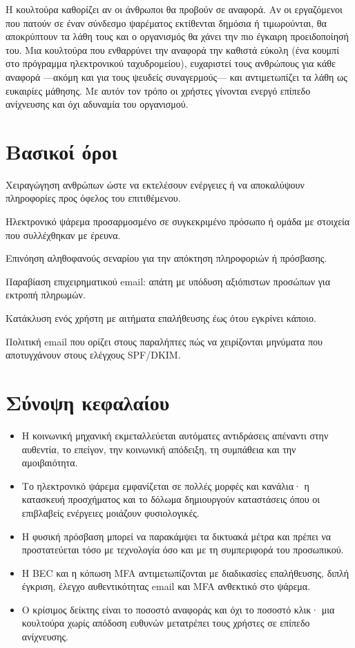 Η κουλτούρα καθορίζει αν οι άνθρωποι θα προβούν σε αναφορά. Αν οι εργαζόμενοι που πατούν σε έναν σύνδεσμο ψαρέματος εκτίθενται δημόσια ή τιμωρούνται, θα αποκρύπτουν τα λάθη τους και ο οργανισμός θα χάνει την πιο έγκαιρη προειδοποίησή του. Μια κουλτούρα που ενθαρρύνει την αναφορά την καθιστά εύκολη (ένα κουμπί στο πρόγραμμα ηλεκτρονικού ταχυδρομείου), ευχαριστεί τους ανθρώπους για κάθε αναφορά —ακόμη και για τους ψευδείς συναγερμούς— και αντιμετωπίζει τα λάθη ως ευκαιρίες μάθησης. Με αυτόν τον τρόπο οι χρήστες γίνονται ενεργό επίπεδο ανίχνευσης και όχι αδυναμία του οργανισμού.

\section*{Βασικοί όροι}
\begin{description}[style=nextline,leftmargin=1.2em]
  \item[Κοινωνική μηχανική] Χειραγώγηση ανθρώπων ώστε να εκτελέσουν ενέργειες ή να αποκαλύψουν πληροφορίες προς όφελος του επιτιθέμενου.
  \item[Στοχευμένο ψάρεμα] Ηλεκτρονικό ψάρεμα προσαρμοσμένο σε συγκεκριμένο πρόσωπο ή ομάδα με στοιχεία που συλλέχθηκαν με έρευνα.
  \item[Κατασκευή προσχήματος] Επινόηση αληθοφανούς σεναρίου για την απόκτηση πληροφοριών ή πρόσβασης.
  \item[BEC] Παραβίαση επιχειρηματικού email: απάτη με υπόδυση αξιόπιστων προσώπων για εκτροπή πληρωμών.
  \item[Κόπωση MFA] Κατάκλυση ενός χρήστη με αιτήματα επαλήθευσης έως ότου εγκρίνει κάποιο.
  \item[DMARC] Πολιτική email που ορίζει στους παραλήπτες πώς να χειρίζονται μηνύματα που αποτυγχάνουν στους ελέγχους SPF/DKIM.
\end{description}

\section*{Σύνοψη κεφαλαίου}
\begin{itemize}
  \item Η κοινωνική μηχανική εκμεταλλεύεται αυτόματες αντιδράσεις απέναντι στην αυθεντία, το επείγον, την κοινωνική απόδειξη, τη συμπάθεια και την αμοιβαιότητα.
  \item Το ηλεκτρονικό ψάρεμα εμφανίζεται σε πολλές μορφές και κανάλια· η κατασκευή προσχήματος και το δόλωμα δημιουργούν καταστάσεις όπου οι επιβλαβείς ενέργειες μοιάζουν φυσιολογικές.
  \item Η φυσική πρόσβαση μπορεί να παρακάμψει τα δικτυακά μέτρα και πρέπει να προστατεύεται τόσο με τεχνολογία όσο και με τη συμπεριφορά του προσωπικού.
  \item Η BEC και η κόπωση MFA αντιμετωπίζονται με διαδικασίες επαλήθευσης, διπλή έγκριση, έλεγχο αυθεντικότητας email και MFA ανθεκτικό στο ψάρεμα.
  \item Ο κρίσιμος δείκτης είναι το ποσοστό αναφοράς και όχι το ποσοστό κλικ· μια κουλτούρα χωρίς απόδοση ευθυνών μετατρέπει τους χρήστες σε επίπεδο ανίχνευσης.
\end{itemize}

